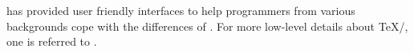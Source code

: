 \documentclass{ltugboat}
\begin{document}
\LTT{} has provided user friendly interfaces to help \LT{} programmers from various backgrounds cope with the differences of \LT{}.
For more low-level details about \TeX{}/\LT{}, one is referred to \cite{knuth1984texbook,berry2017latex}.






\end{document}

